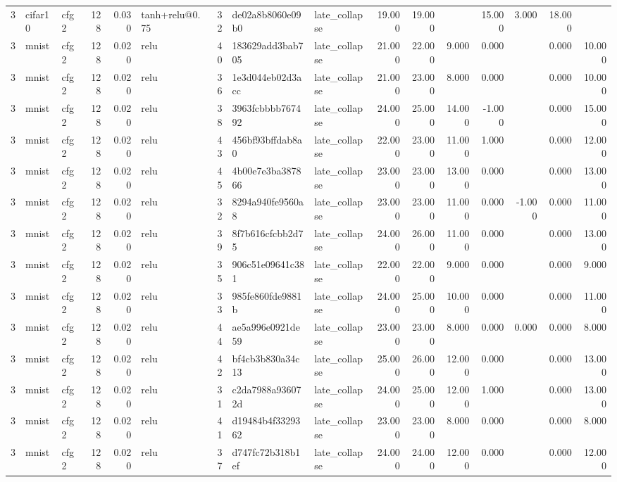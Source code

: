 \begin{table}[htbp]
{\begin{tabular}{@{}rllrrlrllrrrrrrr@{}}
3 & cifar10 & cfg2 & 128 & 0.030 & tanh+relu@0.75 & 32 & de02a8b8060e09b0 & late\_collapse & 19.000 & 19.000 &  & 15.000 & 3.000 & 18.000 &  \\
3 & mnist & cfg2 & 128 & 0.020 & relu & 40 & 183629add3bab705 & late\_collapse & 21.000 & 22.000 & 9.000 & 0.000 &  & 0.000 & 10.000 \\
3 & mnist & cfg2 & 128 & 0.020 & relu & 36 & 1e3d044eb02d3acc & late\_collapse & 21.000 & 23.000 & 8.000 & 0.000 &  & 0.000 & 10.000 \\
3 & mnist & cfg2 & 128 & 0.020 & relu & 38 & 3963fcbbbb767492 & late\_collapse & 24.000 & 25.000 & 14.000 & -1.000 &  & 0.000 & 15.000 \\
3 & mnist & cfg2 & 128 & 0.020 & relu & 43 & 456bf93bffdab8a0 & late\_collapse & 22.000 & 23.000 & 11.000 & 1.000 &  & 0.000 & 12.000 \\
3 & mnist & cfg2 & 128 & 0.020 & relu & 45 & 4b00e7e3ba387866 & late\_collapse & 23.000 & 23.000 & 13.000 & 0.000 &  & 0.000 & 13.000 \\
3 & mnist & cfg2 & 128 & 0.020 & relu & 32 & 8294a940fe9560a8 & late\_collapse & 23.000 & 23.000 & 11.000 & 0.000 & -1.000 & 0.000 & 11.000 \\
3 & mnist & cfg2 & 128 & 0.020 & relu & 39 & 8f7b616cfcbb2d75 & late\_collapse & 24.000 & 26.000 & 11.000 & 0.000 &  & 0.000 & 13.000 \\
3 & mnist & cfg2 & 128 & 0.020 & relu & 35 & 906c51e09641c381 & late\_collapse & 22.000 & 22.000 & 9.000 & 0.000 &  & 0.000 & 9.000 \\
3 & mnist & cfg2 & 128 & 0.020 & relu & 33 & 985fe860fde9881b & late\_collapse & 24.000 & 25.000 & 10.000 & 0.000 &  & 0.000 & 11.000 \\
3 & mnist & cfg2 & 128 & 0.020 & relu & 44 & ae5a996e0921de59 & late\_collapse & 23.000 & 23.000 & 8.000 & 0.000 & 0.000 & 0.000 & 8.000 \\
3 & mnist & cfg2 & 128 & 0.020 & relu & 42 & bf4cb3b830a34c13 & late\_collapse & 25.000 & 26.000 & 12.000 & 0.000 &  & 0.000 & 13.000 \\
3 & mnist & cfg2 & 128 & 0.020 & relu & 31 & c2da7988a936072d & late\_collapse & 24.000 & 25.000 & 12.000 & 1.000 &  & 0.000 & 13.000 \\
3 & mnist & cfg2 & 128 & 0.020 & relu & 41 & d19484b4f3329362 & late\_collapse & 23.000 & 23.000 & 8.000 & 0.000 &  & 0.000 & 8.000 \\
3 & mnist & cfg2 & 128 & 0.020 & relu & 37 & d747fc72b318b1ef & late\_collapse & 24.000 & 24.000 & 12.000 & 0.000 &  & 0.000 & 12.000 \\

\end{tabular}}
\end{table}

